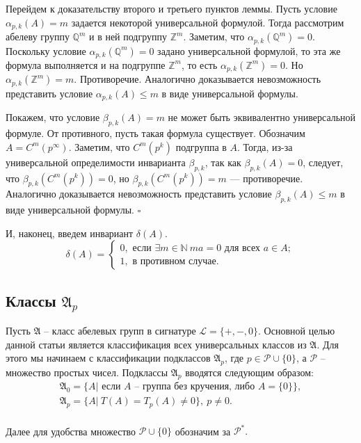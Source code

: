 \documentclass[a4paper,11pt,twoside]{article}
\def\A{{\mathfrak{A}}}
\def\P{{\mathcal{P}}}
\def\L{{\mathcal{L}}}
\def\Z{{\mathbb{Z}}}
\def\N{{\mathbb{N}}}
\def\Q{{\mathbb{Q}}}
\begin{document}
Перейдем к доказательству второго и третьего пунктов леммы. Пусть условие $\alpha_{p,k}(A) = m$ задается некоторой универсальной формулой. Тогда рассмотрим абелеву группу $\Q^m$ и в ней подгруппу $\Z^m$. Заметим, что $\alpha_{p,k}(\Q^m) = 0$. Поскольку условие $\alpha_{p,k}(\Q^m) = 0$ задано универсальной формулой, то эта же формула выполняется и на подгруппе $\Z^m$, то есть $\alpha_{p,k}(\Z^m) = 0$. Но $\alpha_{p,k}(\Z^m) = m$. Противоречие. Аналогично доказывается невозможность представить условие $\alpha_{p,k}(A) \leq m$ в виде универсальной формулы.

Покажем, что условие $\beta_{p,k}(A) = m$ не может быть эквивалентно универсальной формуле. От противного, пусть такая формула существует.  Обозначим $A = C^{m}(p^{\infty})$. Заметим, что $C^{m}(p^k)$ подгруппа в $A$. Тогда, из-за универсальной определимости инварианта $\beta_{p,k}$, так как $\beta_{p,k} (A) = 0$, следует, что $\beta_{p,k} (C^{m}(p^k)) = 0$, но $\beta_{p,k} (C^{m}(p^k)) = m$ --- противоречие. 
Аналогично доказывается невозможность представить условие $\beta_{p,k}(A) \leq m$ в виде универсальной формулы. $\square$



И, наконец, введем инвариант $\delta(A)$.
$$\delta(A) = \left\lbrace 
\begin{array}{l}  
0, \text{ если } \exists m \in \N \ ma = 0 \text{ для всех } a \in A; \\ 
1, \text{ в противном случае.}
\end{array} 
\right.$$


\subsection{Классы $\A_p$}

Пусть $\A$ -- класс абелевых групп в сигнатуре $\L = \{+, -, 0\}.$ Основной целью данной статьи является классификация всех универсальных классов из $\A$. Для этого мы начинаем с классификации подклассов $\A_p$, где $p \in \P \cup \{0\}$, а $\P$ -- множество простых чисел. Подклассы $\A_p$ вводятся следующим образом:
$$\begin{array}{c}

\A_0 = \{A |\text{ если } A \text{ -- группа без кручения, либо } A = \{0\} \}, \\
\A_p = \{A | \ T(A) = T_p(A) \neq 0 \}, \ p \neq 0. \\
\end{array}$$ 

Далее для удобства множество $\P \cup \{0\}$ обозначим за $\P^*.$
\end{document}
